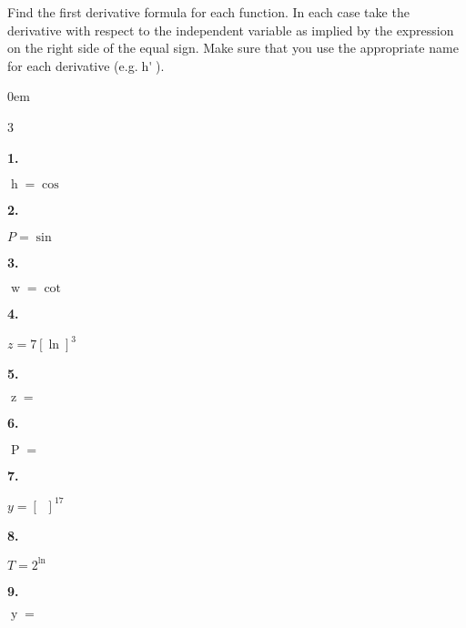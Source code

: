 \documentclass[12pt,]{book}
\theoremstyle{plain}
\theoremstyle{definition}
\numberwithin{equation}{section}
\newenvironment{exercisegroup}%
{\medskip\noindent}%
{\par\bigskip}%
\newlength{\exercisegroupindent}%
\newlength{\exercisegroupitemwidth}%
\newenvironment{exercisegrouplist}%
{\vspace{-\partopsep}%
\begin{adjustwidth}{\exercisegroupindent}{0em}}%
{\end{adjustwidth}%
\vspace{-\partopsep}%
\vspace{\baselineskip}}%
\newenvironment{exercisegroupbycol}[1]%
{\begin{exercisegrouplist}%
\vspace{-\multicolsep}%
\begin{multicols}{#1}%
\setlength{\parindent}{0em}%
\setlength{\exercisegroupitemwidth}{\linewidth}}%
{\end{multicols}%
\vspace{-\multicolsep}%
\end{exercisegrouplist}}%
\newenvironment{exercisegroupitem}[1]%
{\begin{minipage}[t]{\exercisegroupitemwidth}
\vspace{0pt}%
{\bfseries#1}%
\rule{0pt}{\baselineskip}}{\strut%
\end{minipage}%
\hspace{\columnsep}}%
\providecommand\phantomsection{}
\newcommand{\fe}[2]{\mathop{{#1}{\left(#2\right)}}}
\newcommand{\fd}[1]{#1'}
\begin{document}
\begin{exercisegroup}%
Find the first derivative formula for each function.  In each case take the derivative with respect to the independent variable as implied by the expression on the right side of the equal sign.  Make sure that you use the appropriate name for each derivative (e.g.\@ \(\fe{\fd{h}}{t}\)).%
\par
\begin{exercisegroupbycol}{3}%
\begin{exercisegroupitem}{1. }\phantomsection\hypertarget{exercise-337}{\null}
\(\fe{h}{t}=\fe{\cos}{\sqrt{t}}\)%
\end{exercisegroupitem}%
\par%
\begin{exercisegroupitem}{2. }\phantomsection\hypertarget{exercise-338}{\null}
\(P=\fe{\sin}{\theta^4}\)%
\end{exercisegroupitem}%
\par%
\begin{exercisegroupitem}{3. }\phantomsection\hypertarget{exercise-339}{\null}
\(\fe{w}{\alpha}=\fe{\cot}{\sqrt[3]{\alpha}}\)%
\end{exercisegroupitem}%
\par%
\begin{exercisegroupitem}{4. }\phantomsection\hypertarget{exercise-340}{\null}
\(z=7\left[\fe{\ln}{t}\right]^3\)%
\end{exercisegroupitem}%
\par%
\begin{exercisegroupitem}{5. }\phantomsection\hypertarget{exercise-341}{\null}
\(\fe{z}{\theta}=\fe{\sin^4}{\theta}\)%
\end{exercisegroupitem}%
\par%
\begin{exercisegroupitem}{6. }\phantomsection\hypertarget{exercise-342}{\null}
\(\fe{P}{\beta}=\fe{\tan^{-1}}{\beta}\)%
\end{exercisegroupitem}%
\par%
\begin{exercisegroupitem}{7. }\phantomsection\hypertarget{exercise-343}{\null}
\(y=\left[\fe{\sin^{-1}}{t}\right]^{17}\)%
\end{exercisegroupitem}%
\par%
\begin{exercisegroupitem}{8. }\phantomsection\hypertarget{exercise-344}{\null}
\(T=2^{\fe{\ln}{x}}\)%
\end{exercisegroupitem}%
\par%
\begin{exercisegroupitem}{9. }\phantomsection\hypertarget{exercise-345}{\null}
\(\fe{y}{x}=\fe{\sec^{-1}}{e^x}\)%
\end{exercisegroupitem}%
\par%
\end{exercisegroupbycol}%
\end{exercisegroup}%
\end{document}
